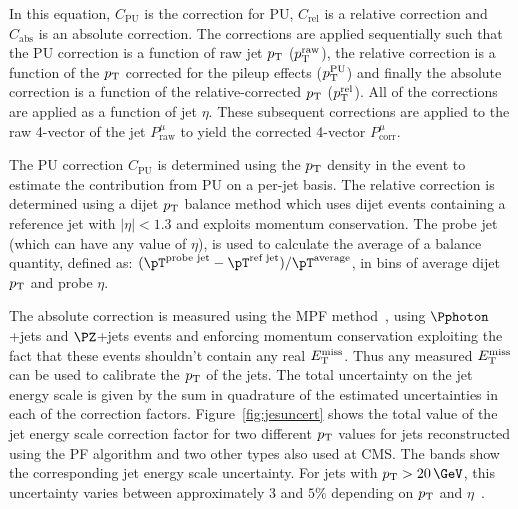 In this equation, $C_{\text{PU}}$ is the correction for \ac{PU},
$C_{\text{rel}}$ is a relative correction and $C_{\text{abs}}$ is an absolute
correction. The corrections are applied sequentially such that the \ac{PU}
correction is a function of raw jet $p_{\mathrm{T}}$ ($p_{\mathrm{T}}^{\text{raw}}$),
the relative correction is a function
of the $p_{\mathrm{T}}$ corrected for the pileup effects ($p_{\mathrm{T}}^{\text{PU}}$) and finally
the absolute correction is a function of the relative-corrected $p_{\mathrm{T}}$
($p_{\mathrm{T}}^{\text{rel}}$). All of the corrections are applied as a function of
jet $\eta$. These subsequent corrections are applied to the raw
4-vector of the jet $P_{\text{raw}}^{\mu}$ to yield the corrected 4-vector
$P_{\text{corr}}^{\mu}$.

The \ac{PU} correction $C_{\text{PU}}$ is determined using the $p_{\mathrm{T}}$ density in the event to
estimate the contribution from \ac{PU} on a per-jet basis. The relative
correction is determined using a dijet $p_{\mathrm{T}}$ balance method which uses dijet
events containing a reference jet with $|\eta| < 1.3$ and exploits momentum conservation.
The probe jet (which can have any value of $\eta$), is used to calculate the
average of a balance quantity, defined as:
$(\pT^{\text{probe jet}}-\pT^{\text{ref jet}})/\pT^{\text{average}}$, in bins of
average dijet $p_{\mathrm{T}}$ and probe $\eta$.  

The absolute correction is measured
using the \ac{MPF} method~\cite{Abe:1992sj}, using $\Pphoton$+jets and $\PZ$+jets
events and enforcing momentum conservation exploiting the fact that these
events shouldn't contain any real $E_{\mathrm{T}}^{\text{miss}}$. Thus any measured $E_{\mathrm{T}}^{\text{miss}}$ can be used to
calibrate the $p_{\mathrm{T}}$ of the jets. The total uncertainty on the jet energy scale
is given by the sum in quadrature of the estimated uncertainties in each of the
correction factors. Figure~\ref{fig:jesuncert} shows the total value of the jet
energy scale correction factor for two different $p_{\mathrm{T}}$ values for jets
reconstructed using the \ac{PF} algorithm and two other types also used at CMS. 
The bands show the corresponding jet energy scale uncertainty. For jets with $\pt>20\,\GeV$, 
this uncertainty varies between approximately $3$ and $5\%$ depending on 
$p_{\mathrm{T}}$ and $\eta$~\cite{CMS-JME-10-011}. 


